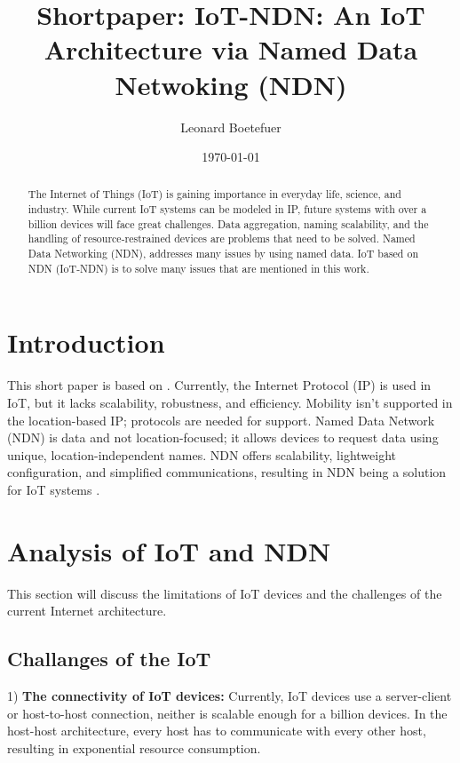 \documentclass[conference]{IEEEtran}
\title{\textbf{Shortpaper:} IoT-NDN: An IoT Architecture via Named Data
Netwoking (NDN)\\}
\author{Leonard Boetefuer}
\date{\today}
\begin{document}
\maketitle

\begin{abstract}
  The Internet of Things (IoT) is gaining importance in everyday life, science, and industry. While current IoT systems can be modeled in IP, future systems with over a billion devices will face great challenges. Data aggregation, naming scalability, and the handling of resource-restrained devices are problems that need to be solved. Named Data Networking (NDN), addresses many issues by using named data. IoT based on NDN (IoT-NDN) is to solve many issues that are mentioned in this work.
  
  \end{abstract}
  
  \section{Introduction}
  
  
  
  This short paper is based on \cite{b99}.
  Currently, the Internet Protocol (IP) is used in IoT, but it lacks scalability, robustness, and efficiency. Mobility isn't supported in the location-based IP; protocols are needed for support.
  Named Data Network (NDN) is data and not location-focused; it allows devices to request data using unique, location-independent names. NDN offers scalability, lightweight configuration, and simplified communications, resulting in NDN being a solution for IoT systems \cite{b1}.
  
   
  \section{Analysis of IoT and NDN}
  This section will discuss the limitations of IoT devices and the challenges of the current Internet architecture.
  \subsection{Challanges of the IoT}
  1) \textbf{The connectivity of IoT devices:}
  Currently, IoT devices use a server-client or host-to-host connection, neither is scalable enough for a billion devices.
  In the host-host architecture, every host has to communicate with every other host, resulting in exponential resource consumption.
  
\end{document}
